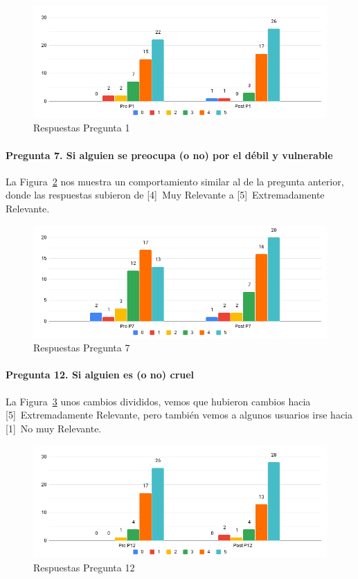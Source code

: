 \begin{figure}[h]
    \centering
    \includegraphics[width=.9\textwidth]{imgs/chart-p1.png}
    \caption{Respuestas Pregunta 1}
    \label{fig:chart-p1}
\end{figure}

\paragraph{Pregunta 7. Si alguien se preocupa (o no) por el débil y vulnerable}
La Figura~\ref{fig:chart-p7} nos muestra un comportamiento similar al de la pregunta anterior, donde las respuestas subieron de [4]~Muy Relevante a [5]~Extremadamente Relevante.

\begin{figure}[h]
    \centering
    \includegraphics[width=.9\textwidth]{imgs/chart-p7.png}
    \caption{Respuestas Pregunta 7}
    \label{fig:chart-p7}
\end{figure}

\paragraph{Pregunta 12. Si alguien es (o no) cruel}
La Figura~\ref{fig:chart-p12} unos cambios divididos, vemos que hubieron cambios hacia [5]~Extremadamente Relevante, pero también vemos a algunos usuarios irse hacia [1]~No muy Relevante.

\begin{figure}[h]
    \centering
    \includegraphics[width=.9\textwidth]{imgs/chart-p12.png}
    \caption{Respuestas Pregunta 12}
    \label{fig:chart-p12}
\end{figure}

